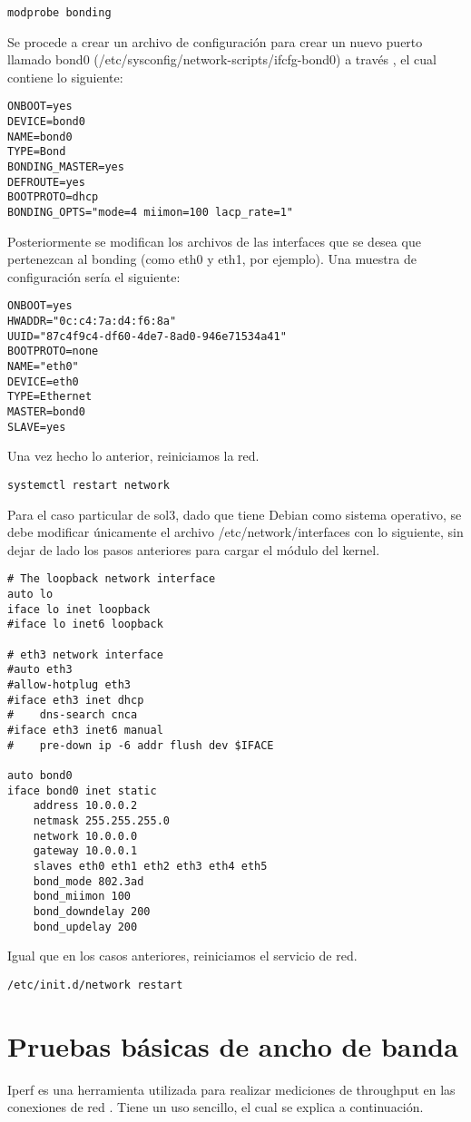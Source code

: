\begin{lstlisting}
modprobe bonding
\end{lstlisting}

Se procede a crear un archivo de configuración para crear un nuevo puerto llamado bond0 (/etc/sysconfig/network-scripts/ifcfg-bond0) a través , el cual contiene lo siguiente:

\begin{lstlisting}
ONBOOT=yes
DEVICE=bond0
NAME=bond0
TYPE=Bond
BONDING_MASTER=yes
DEFROUTE=yes
BOOTPROTO=dhcp
BONDING_OPTS="mode=4 miimon=100 lacp_rate=1"
\end{lstlisting}

Posteriormente se modifican los archivos de las interfaces que se desea que pertenezcan al bonding (como eth0 y eth1, por ejemplo). Una muestra de configuración sería el siguiente:

\begin{lstlisting}
ONBOOT=yes
HWADDR="0c:c4:7a:d4:f6:8a"
UUID="87c4f9c4-df60-4de7-8ad0-946e71534a41"
BOOTPROTO=none
NAME="eth0"
DEVICE=eth0
TYPE=Ethernet
MASTER=bond0
SLAVE=yes
\end{lstlisting}

Una vez hecho lo anterior, reiniciamos la red.

\begin{lstlisting}
systemctl restart network
\end{lstlisting}

Para el caso particular de sol3, dado que tiene Debian como sistema operativo, se debe modificar únicamente el archivo /etc/network/interfaces con lo siguiente, sin dejar de lado los pasos anteriores para cargar el módulo del kernel.

\begin{lstlisting}
# The loopback network interface
auto lo
iface lo inet loopback
#iface lo inet6 loopback

# eth3 network interface
#auto eth3
#allow-hotplug eth3
#iface eth3 inet dhcp
#    dns-search cnca
#iface eth3 inet6 manual
#    pre-down ip -6 addr flush dev $IFACE

auto bond0
iface bond0 inet static
	address 10.0.0.2
	netmask 255.255.255.0
	network 10.0.0.0
	gateway 10.0.0.1
	slaves eth0 eth1 eth2 eth3 eth4 eth5
	bond_mode 802.3ad
	bond_miimon 100
	bond_downdelay 200
	bond_updelay 200
\end{lstlisting}
Igual que en los casos anteriores, reiniciamos el servicio de red.

\begin{lstlisting}
/etc/init.d/network restart
\end{lstlisting}

\section{Pruebas básicas de ancho de banda}
Iperf es una herramienta utilizada para realizar mediciones de throughput en las conexiones de red \cite{iperf}. Tiene un uso sencillo, el cual se explica a continuación.
\clearpage